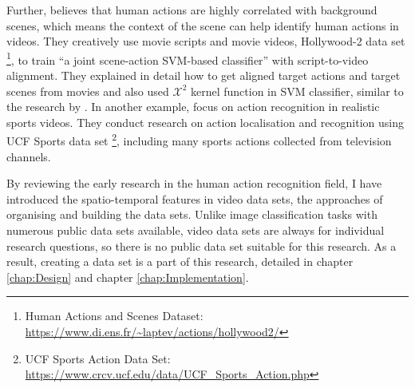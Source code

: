 Further, \citet{marszalek2009actions} believes that human actions are highly correlated with background scenes, which means the context of the scene can help identify human actions in videos.
They creatively use movie scripts and movie videos, Hollywood-2 data set \footnote{Human Actions and Scenes Dataset: \url{https://www.di.ens.fr/~laptev/actions/hollywood2/}}, to train ``a joint scene-action SVM-based classifier'' with script-to-video alignment.
They explained in detail how to get aligned target actions and target scenes from movies and also used $\mathcal{X}^2$ kernel function in SVM classifier, similar to the research by \citet{schuldt2004recognizing}. In another example, \citet{Soomro2014} focus on action recognition in realistic sports videos.
They conduct research on action localisation and recognition using UCF Sports data set \footnote{UCF Sports Action Data Set: \url{https://www.crcv.ucf.edu/data/UCF_Sports_Action.php}}, including many sports actions collected from television channels.

By reviewing the early research in the human action recognition field, I have introduced the spatio-temporal features in video data sets, the approaches of organising and building the data sets.
Unlike image classification tasks with numerous public data sets available, video data sets are always for individual research questions, so there is no public data set suitable for this research.
As a result, creating a data set is a part of this research, detailed in chapter \ref{chap:Design} and chapter \ref{chap:Implementation}.
